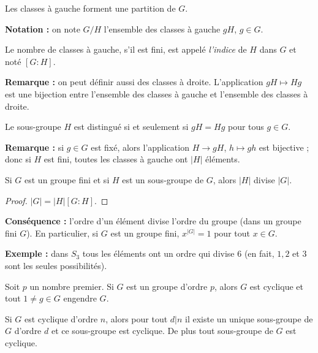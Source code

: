 \documentclass[class=report,crop=false]{standalone}
\begin{document}
\begin{corollaire}
Les classes à gauche forment une partition de $G$.
\end{corollaire}

{\bf Notation :} on note $G/H$ l'ensemble des classes à gauche $gH$, $g \in G$.

Le nombre de classes à gauche, s'il est fini, est appelé {\it l'indice} de $H$ dans $G$  et noté $[G:H]$.

{\bf Remarque : } on peut définir aussi des classes à droite. L'application $gH \mapsto Hg$ est une bijection entre l'ensemble des classes à gauche et l'ensemble des classes à droite.

\begin{proposition}
Le sous-groupe $H$ est distingué si et seulement si $gH=Hg$ pour tous $g \in G$.
\end{proposition}

{\bf Remarque :} si $g \in G$ est fixé, alors l'application $H \to gH$, $h \mapsto gh$ est bijective ; donc si $H$ est fini, toutes les classes à gauche ont $|H|$ éléments.

\begin{corollaire}
Si $G$ est un groupe fini et si $H$ est un sous-groupe de $G$, alors $|H| $ divise $|G|$.
\end{corollaire}

\begin{proof}
$|G| = |H|[G:H]$.
\end{proof}

{\bf Conséquence : } l'ordre d'un élément divise l'ordre du groupe (dans un groupe fini $G$). En particulier, si $G$ est un groupe fini, $x^{|G|}=1$ pour tout $x \in G$.

{\bf Exemple : }dans $S_3$ tous les éléments ont un ordre qui divise $6$ (en fait, $1,2$ et $3$ sont les seules possibilités).

\begin{exercicecours}
Soit $p$ un nombre premier. Si $G$ est un groupe d'ordre $p$, alors $G$ est cyclique et tout $1 \neq g \in G$ engendre $G$. 
\end{exercicecours}

\begin{proposition}
Si $G$ est cyclique d'ordre $n$, alors pour tout $d |n$ il existe un unique sous-groupe de $G$ d'ordre $d$ et ce sous-groupe est cyclique. De plus tout sous-groupe de $G$ est cyclique.
\end{proposition}
\end{document}
